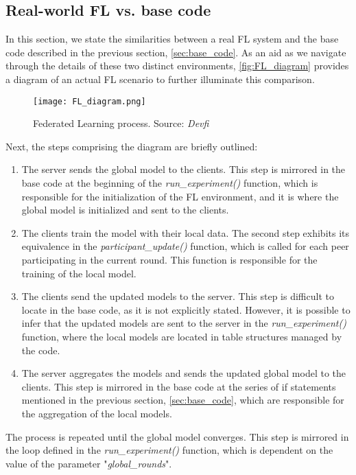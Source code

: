\subsection{Real-world FL vs. base code}
In this section, we state the similarities between a real FL system and the base code described in the previous section, \ref{sec:base_code}. As an aid as we navigate through the details of these two distinct environments, \autoref{fig:FL_diagram} provides a diagram of an actual FL scenario to further illuminate this comparison. 
\begin{figure}[h]
        \centering %
        \texttt{[image: FL\_diagram.png]}
        \caption{Federated Learning process. Source: \textit{Devfi}} %
        \label{fig:FL_diagram}
\end{figure}

Next, the steps comprising the diagram are briefly outlined:
\begin{enumerate}
        \item The server sends the global model to the clients. This step is mirrored in the base code at the beginning of the \textit{run\_experiment()} function, which is responsible for the initialization of the FL environment, and it is where the global model is initialized and sent to the clients.
        \item The clients train the model with their local data. The second step exhibits its equivalence in the \textit{participant\_update()} function, which is called for each peer participating in the current round. This function is responsible for the training of the local model.
        \item The clients send the updated models to the server. This step is difficult to locate in the base code, as it is not explicitly stated. However, it is possible to infer that the updated models are sent to the server in the \textit{run\_experiment()} function, where the local models are located in table structures managed by the code.
        \item The server aggregates the models and sends the updated global model to the clients. This step is mirrored in the base code at the series of if statements mentioned in the previous section, \ref{sec:base_code}, which are responsible for the aggregation of the local models.
\end{enumerate}
The process is repeated until the global model converges. This step is mirrored in the loop defined in the \textit{run\_experiment()} function, which is dependent on the value of the parameter "\textit{global\_rounds}".


